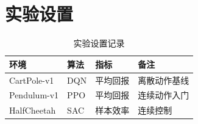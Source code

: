 \section{实验设置}

\begin{table}[H]
  \centering
  \begin{tabular}{llll}
    \toprule
    环境 & 算法 & 指标 & 备注 \\
    \midrule
    CartPole-v1 & DQN & 平均回报 & 离散动作基线 \\
    Pendulum-v1 & PPO & 平均回报 & 连续动作入门 \\
    HalfCheetah & SAC & 样本效率 & 连续控制 \\
    \bottomrule
  \end{tabular}
  \caption{实验设置记录}
  \label{tab:experiment-settings}
\end{table}
